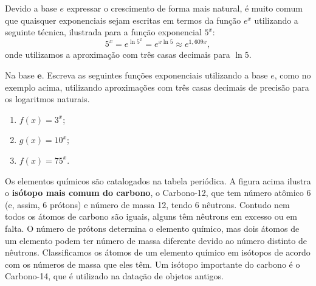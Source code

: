Devido a base $e$ expressar o crescimento de forma mais natural, é muito comum que quaisquer exponenciais sejam escritas em termos da função $e^x$ utilizando a seguinte técnica, ilustrada para a função exponencial $5^x$:
$$
5^x = e^{\ln 5^x} = e^{x\ln 5} \approx e^{1{,}609 x},
$$
onde utilizamos a aproximação com três casas decimais para $\ln 5$.

\begin{task}{Na base $\bm{e}$.}
Escreva as seguintes funções exponenciais utilizando a base $e$, como no exemplo acima, utilizando aproximações com três casas decimais de precisão para os logaritmos naturais.
\begin{enumerate}
\item $f(x)=3^x$;
\item $g(x)=10^x$;
\item $f(x)=75^x$.
\end{enumerate}
\end{task}


\label{DecaimentoRadioativo}


\begin{figure}[H]
\centering

\end{figure}


Os elementos químicos são catalogados na tabela periódica. A figura acima ilustra o \textbf{isótopo mais comum do carbono}, o Carbono-12, que tem número atômico 6 (e, assim, 6 prótons) e número de massa 12, tendo 6 nêutrons. Contudo nem todos os átomos de carbono são iguais, alguns têm nêutrons em excesso ou em falta. O número de prótons determina o elemento químico, mas dois átomos de um elemento podem ter número de massa diferente devido ao número distinto de nêutrons. Classificamos os átomos de um elemento químico em isótopos de acordo com os números de massa que eles têm. Um isótopo importante do carbono é o Carbono-14, que é utilizado na datação de objetos antigos.


